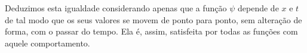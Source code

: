 Deduzimos esta igualdade considerando apenas que a função $\psi$ depende de $x$ e
$t$ de tal modo que os seus valores se movem de ponto para ponto, sem alteração
de forma, com o passar do tempo. Ela é, assim, satisfeita por todas as funções
com aquele comportamento.


